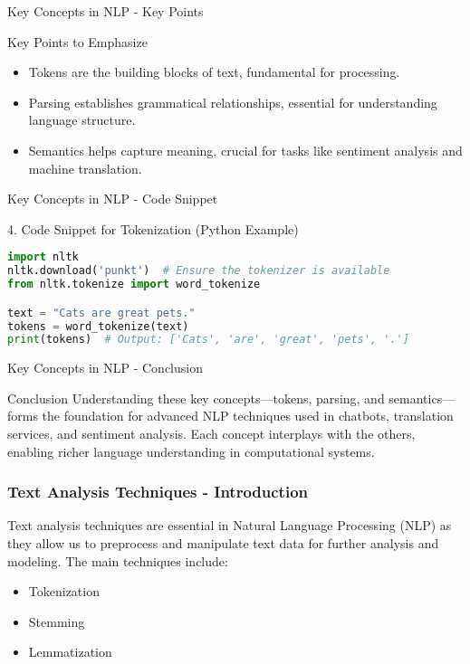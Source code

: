 \documentclass[aspectratio=169]{beamer}
\begin{document}
\begin{frame}[fragile]{Key Concepts in NLP - Key Points}
    \begin{block}{Key Points to Emphasize}
        \begin{itemize}
            \item Tokens are the building blocks of text, fundamental for processing.
            \item Parsing establishes grammatical relationships, essential for understanding language structure.
            \item Semantics helps capture meaning, crucial for tasks like sentiment analysis and machine translation.
        \end{itemize}
    \end{block}
\end{frame}

\begin{frame}[fragile]{Key Concepts in NLP - Code Snippet}
    \begin{block}{4. Code Snippet for Tokenization (Python Example)}
        \begin{lstlisting}[language=Python]
import nltk
nltk.download('punkt')  # Ensure the tokenizer is available
from nltk.tokenize import word_tokenize

text = "Cats are great pets."
tokens = word_tokenize(text)
print(tokens)  # Output: ['Cats', 'are', 'great', 'pets', '.']
        \end{lstlisting}
    \end{block}
\end{frame}

\begin{frame}[fragile]{Key Concepts in NLP - Conclusion}
    \begin{block}{Conclusion}
        Understanding these key concepts—tokens, parsing, and semantics—forms the foundation for advanced NLP techniques used in chatbots, translation services, and sentiment analysis. Each concept interplays with the others, enabling richer language understanding in computational systems.
    \end{block}
\end{frame}

\begin{frame}[fragile]
    \frametitle{Text Analysis Techniques - Introduction}
    Text analysis techniques are essential in Natural Language Processing (NLP) as they allow us to preprocess and manipulate text data for further analysis and modeling. 
    The main techniques include:
    \begin{itemize}
        \item Tokenization
        \item Stemming
        \item Lemmatization
    \end{itemize}
\end{frame}
\end{document}
